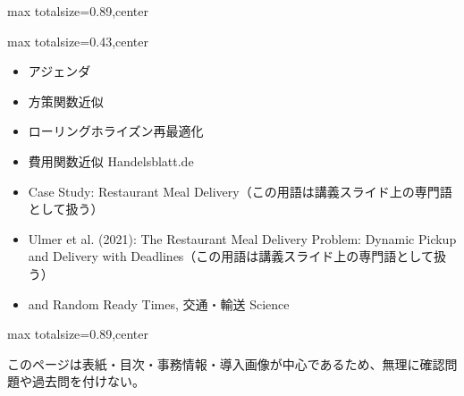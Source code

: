 \begin{minipage}[t]{0.58\textwidth}
\begin{adjustbox}{max totalsize={\textwidth}{0.89\textheight},center}
\begin{minipage}{\textwidth}
\end{minipage}
\end{adjustbox}
\end{minipage}


\clearpage
{}
\begin{minipage}[t]{0.405\textwidth}
\begin{adjustbox}{max totalsize={\textwidth}{0.43\textheight},center}
\begin{minipage}{\textwidth}\scriptsize
{}\begin{itemize}
\item アジェンダ
\item 方策関数近似
\item ローリングホライズン再最適化
\item 費用関数近似 Handelsblatt.de
\item Case Study: Restaurant Meal Delivery（この用語は講義スライド上の専門語として扱う）
\item Ulmer et al. (2021): The Restaurant Meal Delivery Problem: Dynamic Pickup and Delivery with Deadlines（この用語は講義スライド上の専門語として扱う）
\item and Random Ready Times, 交通・輸送 Science
\end{itemize}
\end{minipage}
\end{adjustbox}
\end{minipage}\hfill
\begin{minipage}[t]{0.58\textwidth}
\begin{adjustbox}{max totalsize={\textwidth}{0.89\textheight},center}
\begin{minipage}{\textwidth}\scriptsize
{}このページは表紙・目次・事務情報・導入画像が中心であるため、無理に確認問題や過去問を付けない。
\end{minipage}
\end{adjustbox}
\end{minipage}



